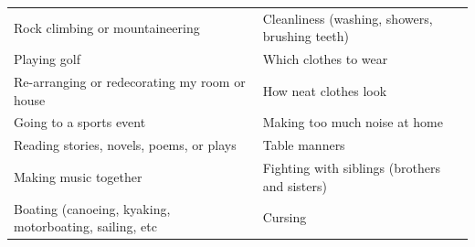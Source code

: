 \documentclass[]{book}
\begin{document}
\begin{longtable}[]{@{}ll@{}}
\begin{minipage}[t]{0.50\columnwidth}\raggedright
Rock climbing or mountaineering\strut
\end{minipage} & \begin{minipage}[t]{0.44\columnwidth}\raggedright
Cleanliness (washing, showers, brushing teeth)\strut
\end{minipage}\tabularnewline
\begin{minipage}[t]{0.50\columnwidth}\raggedright
Playing golf\strut
\end{minipage} & \begin{minipage}[t]{0.44\columnwidth}\raggedright
Which clothes to wear\strut
\end{minipage}\tabularnewline
\begin{minipage}[t]{0.50\columnwidth}\raggedright
Re-arranging or redecorating my room or house\strut
\end{minipage} & \begin{minipage}[t]{0.44\columnwidth}\raggedright
How neat clothes look\strut
\end{minipage}\tabularnewline
\begin{minipage}[t]{0.50\columnwidth}\raggedright
Going to a sports event\strut
\end{minipage} & \begin{minipage}[t]{0.44\columnwidth}\raggedright
Making too much noise at home\strut
\end{minipage}\tabularnewline
\begin{minipage}[t]{0.50\columnwidth}\raggedright
Reading stories, novels, poems, or plays\strut
\end{minipage} & \begin{minipage}[t]{0.44\columnwidth}\raggedright
Table manners\strut
\end{minipage}\tabularnewline
\begin{minipage}[t]{0.50\columnwidth}\raggedright
Making music together\strut
\end{minipage} & \begin{minipage}[t]{0.44\columnwidth}\raggedright
Fighting with siblings (brothers and sisters)\strut
\end{minipage}\tabularnewline
\begin{minipage}[t]{0.50\columnwidth}\raggedright
Boating (canoeing, kyaking, motorboating, sailing, etc\strut
\end{minipage} & \begin{minipage}[t]{0.44\columnwidth}\raggedright
Cursing\strut
\end{minipage}\tabularnewline

\end{longtable}
\end{document}
